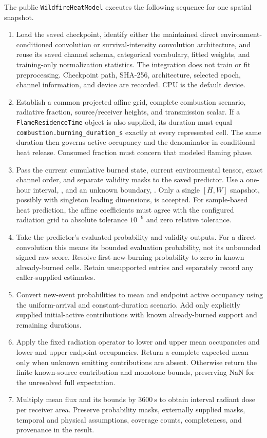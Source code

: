 \documentclass[11pt,a4paper]{article}
\begin{document}
The public \texttt{WildfireHeatModel} executes the following sequence for
one spatial snapshot.
\begin{enumerate}
 \item Load the saved checkpoint, identify either the maintained direct
 environment-conditioned convolution or survival-intensity convolution
 architecture, and reuse its saved channel schema, categorical vocabulary,
 fitted weights, and training-only normalization statistics. The integration
 does not train or fit preprocessing. Checkpoint path, SHA-256, architecture,
 selected epoch, channel information, and device are recorded. CPU is the
 default device.
 \item Establish a common projected affine grid, complete combustion scenario,
 radiative fraction, source/receiver heights, and transmission scalar. If a
 \texttt{FlameResidenceTime} object is also supplied, its duration must equal
 \texttt{combustion.burning\_duration\_s} exactly at every represented cell.
 The same duration then governs active occupancy and the denominator in
 conditional heat release. Consumed fraction must concern that modeled
 flaming phase.
 \item Pass the current cumulative burned state, current environmental tensor,
 exact channel order, and separate validity masks to the saved predictor.
 Use a one-hour interval, , and an unknown boundary,
 . Only a
 single $[H,W]$ snapshot, possibly with singleton leading dimensions, is
 accepted. For sample-based heat prediction, the affine coefficients must
 agree with the configured radiation grid to absolute tolerance $10^{-9}$
 and zero relative tolerance.
 \item Take the predictor's evaluated probability and validity outputs. For a
 direct convolution this means its bounded evaluation probability, not its
 unbounded signed raw score. Resolve first-new-burning probability to zero
 in known already-burned cells. Retain unsupported entries and separately
 record any caller-supplied estimates.
 \item Convert new-event probabilities to mean and endpoint active occupancy
 using the uniform-arrival and constant-duration scenario. Add only explicitly
 supplied initial-active contributions with known already-burned support
 and remaining durations.
 \item Apply the fixed radiation operator to lower and upper mean occupancies
 and lower and upper endpoint occupancies. Return a complete expected mean
 only when unknown emitting contributions are absent. Otherwise return
 the finite known-source contribution and monotone bounds, preserving NaN
 for the unresolved full expectation.
 \item Multiply mean flux and its bounds by $3600\ \mathrm{s}$ to obtain
 interval radiant dose per receiver area. Preserve probability masks,
 externally supplied masks, temporal and physical assumptions, coverage
 counts, completeness, and provenance in the result.
\end{enumerate}
\end{document}
